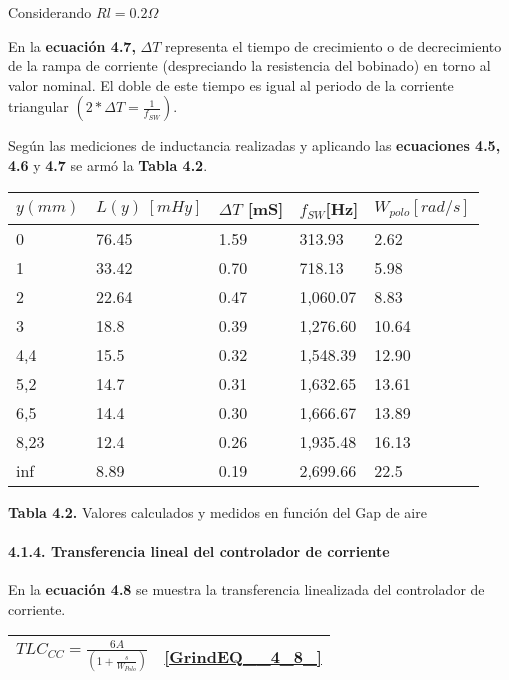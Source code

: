 \documentclass{article} %
\begin{document}
\noindent Considerando $Rl=0.2\mathit{\Omega}\ $     

\noindent 

\noindent En la \textbf{ecuaci\'{o}n 4.7,} $\mathit{\Delta}T$ representa el tiempo de crecimiento o de decrecimiento de la rampa de corriente (despreciando la resistencia del bobinado) en torno al valor nominal. El doble de este tiempo es igual al periodo de la corriente triangular $(2*\mathit{\Delta}T=\frac{1}{f_{SW}})$.

\noindent Seg\'{u}n las mediciones de inductancia realizadas y aplicando las \textbf{ecuaciones 4.5, 4.6 }y\textbf{ 4.7} se arm\'{o} la \textbf{Tabla 4.2}.

\noindent 

\begin{tabular}{|p{0.9in}|p{0.7in}|p{0.7in}|p{0.8in}|p{0.8in}|} \hline 
$y(mm)$ & $L(y)\ [mHy]$ & $\mathit{\Delta}T$ [mS] & $f_{SW}$[Hz] & $W_{polo}[rad/s]$  \\ \hline 
0 & 76.45 & 1.59 & 313.93 & 2.62 \\ \hline 
1 & 33.42 & 0.70 & 718.13 & 5.98 \\ \hline 
2 & 22.64 & 0.47 & 1,060.07 & 8.83 \\ \hline 
3 & 18.8 & 0.39 & 1,276.60 & 10.64 \\ \hline 
4,4 & 15.5 & 0.32 & 1,548.39 & 12.90 \\ \hline 
5,2 & 14.7 & 0.31 & 1,632.65 & 13.61 \\ \hline 
6,5 & 14.4 & 0.30 & 1,666.67 & 13.89 \\ \hline 
8,23 & 12.4 & 0.26 & 1,935.48 & 16.13 \\ \hline 
inf & 8.89 & 0.19 & 2,699.66 & 22.5 \\ \hline 
\end{tabular}

\textbf{Tabla 4.2. }Valores calculados y medidos en funci\'{o}n del Gap de aire

\noindent 
\paragraph{4.1.4. Transferencia lineal del controlador de corriente}

\noindent En la \textbf{ecuaci\'{o}n 4.8 }se muestra la transferencia linealizada del controlador de corriente.

\begin{tabular}{|p{3.9in}|p{0.4in}|} \hline 
$TLC_{CC}=\frac{6A}{(1+\frac{s}{W_{Polo}})}$ & \eqref{GrindEQ__4_8_}  \\ \hline 
\end{tabular}
\end{document}
